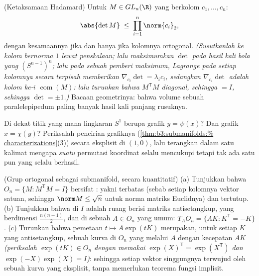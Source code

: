 \begin{exercise}[$\star\star\star$]\label{exo:b3:submanifolds:9}
(Ketaksamaan Hadamard) Untuk $M \in GL_n(\R)$ yang berkolom
$c_1, \dots, c_n$:
\[
\abs{\det M} \;\leq\; \prod_{i=1}^n\norm{c_i}_2 ,
\]
dengan kesamaannya jika dan hanya jika kolomnya ortogonal. \emph{(Susutkanlah
ke kolom bernorma $1$ lewat penskalaan; lalu maksimumkan $\det$ pada
hasil kali bola yang  $(S^{n-1})^n$; lalu pada sebuah pemberi maksimum,
Lagrange pada setiap kolomnya secara terpisah memberikan $\nabla_{c_i}\det =
\lambda_ic_i$, sedangkan $\nabla_{c_i}\det$ adalah kolom ke-$i$
$\operatorname{com}(M)$: lalu turunkan bahwa $M^{\mathsf T}M$ diagonal,
sehingga $= I$, sehingga $\det = \pm1$.)} Bacaan geometrinya: bahwa
volume sebuah paralelepipedum paling banyak hasil kali panjang
rusuknya.
\end{exercise}

\begin{exercise}[$\star\star$]\label{exo:b3:submanifolds:10}
Di dekat titik yang mana lingkaran $S^1$ berupa grafik $y =
\psi(x)$? Dan grafik $x = \chi(y)$? Periksalah pencirian
grafiknya (\cref{thm:b3:submanifolds:%
characterizations}(3)) secara eksplisit di $(1, 0)$, lalu terangkan
dalam satu kalimat mengapa \emph{suatu} permutasi koordinat
selalu mencukupi tetapi tak ada satu pun yang selalu berhasil.
\end{exercise}

\begin{exercise}[$\star\star$]\label{exo:b3:submanifolds:11}
(Grup ortogonal sebagai submanifold, secara kuantitatif)
(a) Tunjukkan bahwa $O_n = \{M : M^{\mathsf T}M = I\}$ bersifat :
yakni terbatas (sebab setiap kolomnya vektor satuan, sehingga $\norm M \leq
\sqrt n$ untuk norma matriks Euclidnya) dan tertutup.
(b) Tunjukkan bahwa  di $I$ adalah ruang berisi matriks
antisetangkup, yang berdimensi $\frac{n(n-1)}2$, dan
di sebuah $A \in O_n$ yang umum: $T_AO_n = \{AK : K^{\mathsf T} =
-K\}$.
(c) Turunkan bahwa pemetaan $t \mapsto A\exp(tK)$ merupakan, untuk setiap
$K$ yang antisetangkup, sebuah kurva di $O_n$ yang melalui $A$ dengan
kecepatan $AK$ \emph{(periksalah $\exp(tK) \in O_n$ dengan memakai
$\exp(X)^{\mathsf T} = \exp(X^{\mathsf T})$ dan
$\exp(-X)\exp(X) = I$)}: sehingga setiap vektor singgungnya terwujud oleh
sebuah kurva yang eksplisit, tanpa memerlukan teorema fungsi implisit.
\end{exercise}

